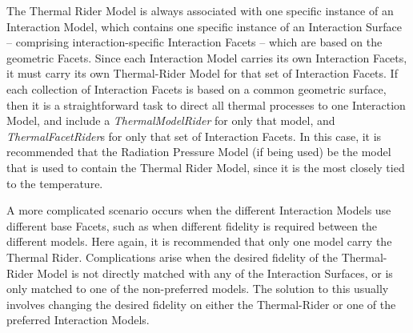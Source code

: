 The Thermal Rider Model is always associated with one specific instance of an Interaction Model,
which contains one specific instance of an Interaction Surface -- comprising interaction-specific Interaction Facets --
which are based on the geometric Facets.  Since each Interaction
Model carries its own Interaction Facets, it must carry its own
Thermal-Rider Model for that set of Interaction Facets.  
If each collection of Interaction Facets is based on a common
geometric surface, then it is a straightforward task to direct all thermal
processes to one Interaction Model, and include a
\textit{ThermalModelRider}
for only that model, and \textit{ThermalFacetRider}s for only that set of
Interaction Facets.
In this case, it is recommended that the Radiation Pressure Model (if being used) be the model that is used to contain the Thermal Rider Model, since it is the most closely tied to the temperature.

A more complicated scenario occurs when the different Interaction Models use
different base Facets, such as when different fidelity is required between the
different models.  Here again, it is recommended that only one model carry the
Thermal Rider.  Complications arise when the desired fidelity of the
Thermal-Rider Model is not directly matched with any of the Interaction Surfaces,
or is only matched to one of the non-preferred models.  The solution to this
usually involves changing the desired fidelity on either the Thermal-Rider or one of the
preferred Interaction Models.

